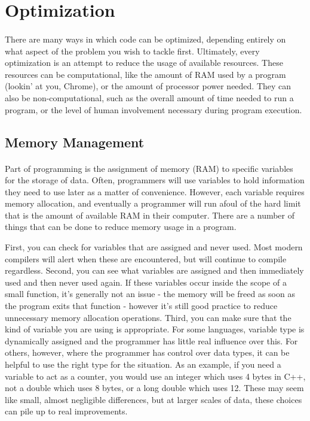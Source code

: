 \section{Optimization}
\paragraph{} There are many ways in which code can be optimized, depending entirely on what aspect of the problem you wish to tackle first.
Ultimately, every optimization is an attempt to reduce the usage of available resources.
These resources can be computational, like the amount of RAM used by a program (lookin' at you, Chrome), or the amount of processor power needed.
They can also be non-computational, such as the overall amount of time needed to run a program, or the level of human involvement necessary during program execution.

\subsection*{Memory Management}
\paragraph{} Part of programming is the assignment of memory (RAM) to specific variables for the storage of data.
Often, programmers will use variables to hold information they need to use later as a matter of convenience.
However, each variable requires memory allocation, and eventually a programmer will run afoul of the hard limit that is the amount of available RAM in their computer.
There are a number of things that can be done to reduce memory usage in a program.

First, you can check for variables that are assigned and never used.  
Most modern compilers will alert when these are encountered, but will continue to compile regardless.
Second, you can see what variables are assigned and then immediately used and then never used again.
If these variables occur inside the scope of a small function, it's generally not an issue - the memory will be freed as soon as the program exits that function - however it's still good practice to reduce unnecessary memory allocation operations.
Third, you can make sure that the kind of variable you are using is appropriate.
For some languages, variable type is dynamically assigned and the programmer has little real influence over this.
For others, however, where the programmer has control over data types, it can be helpful to use the right type for the situation.
As an example, if you need a variable to act as a counter, you would use an integer which uses 4 bytes in C++, not a double which uses 8 bytes, or a long double which uses 12.  
These may seem like small, almost negligible differences, but at larger scales of data, these choices can pile up to real improvements.

